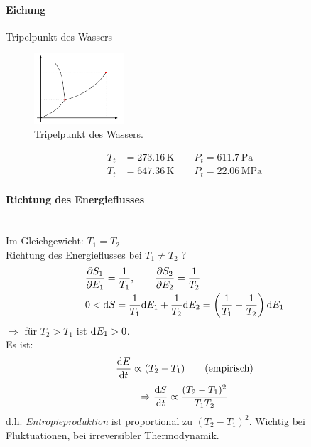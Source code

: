 \paragraph{Eichung} Tripelpunkt des Wassers
\begin{figure}[H]
    \begin{center}
        \includegraphics[width=0.3\textwidth]{../img/tripelpoint.pdf}
        \caption{Tripelpunkt des Wassers.}
        \label{img:tripelpoint}
    \end{center}
\end{figure}
\begin{equation}
    \begin{split}
        T_t &= 273.16 \, \text{K} \qquad P_t = 611.7 \, \text{Pa} \\
        T_t &= 647.36 \, \text{K} \qquad P_t = 22.06 \, \text{MPa}
    \end{split}
\end{equation}

\paragraph{Richtung des Energieflusses} \mbox{}\\
Im Gleichgewicht: $T_1 = T_2$ \\
Richtung des Energieflusses bei $T_1 \neq T_2$ ?
\begin{equation}
    \begin{split}
        & \frac{\partial S_1}{\partial E_1} = \frac{1}{T_1}, \qquad \frac{\partial S_2}{\partial E_2} = \frac{1}{T_2} \\
        & 0 < \mathrm{d} S = \frac{1}{T_1} \mathrm{d} E_1 + \frac{1}{T_2} \mathrm{d} E_2 = \left( \frac{1}{T_1} - \frac{1}{T_2} \right) \mathrm{d} E_1
    \end{split}
\end{equation}
$\Rightarrow$ für $T_2 > T_1$ ist $\mathrm{d} E_1 > 0$. \\
Es ist:
\begin{equation}
    \frac{\mathrm{d} E}{\mathrm{d} t} \propto (T_2 - T_1) \qquad \text{(empirisch)}
\end{equation}
\begin{equation}
    \Rightarrow \frac{\mathrm{d} S}{\mathrm{d} t} \propto \frac{(T_2 - T_1)^2}{T_1 T_2}
\end{equation}
d.h. \emph{Entropieproduktion} ist proportional zu $(T_2 - T_1)^2$. Wichtig bei Fluktuationen, bei irreversibler Thermodynamik.

